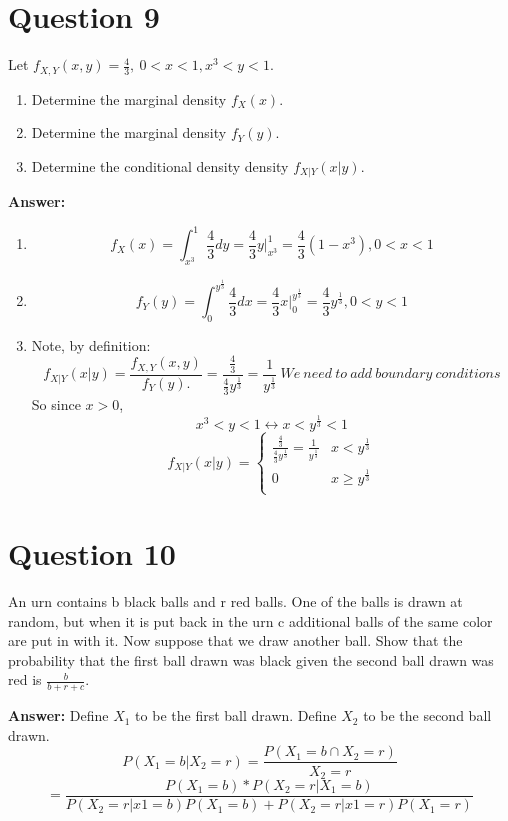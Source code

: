 \documentclass[svgnames]{article}
\begin{document}
\section{Question 9}
Let $f_{X,Y}(x,y)=\frac{4}{3},\ 0 < x <1, x^3 < y <1$.
\begin{enumerate}[label = (\alph*)]
\item
Determine the marginal density $f_X(x).$
\item 
Determine the marginal density $f_Y(y).$
\item
Determine the conditional density density $f_{X|Y}(x|y).$

\end{enumerate}
\textbf{Answer:}

\begin{enumerate}[label = (\alph*)]
\item
$$f_X(x)=\int^{1}_{x^3}\frac{4}{3}dy=\frac{4}{3}y\Big|^{1}_{x^3}=\frac{4}{3}(1-x^3), 0<x<1$$
\item
$$f_Y(y)=\int^{y^{\frac{1}{3}}}_{0}\frac{4}{3}dx=\frac{4}{3}x\Big|^{y^{\frac{1}{3}}}_{0}=\frac{4}{3}y^{\frac{1}{3}},0<y<1$$
\item
Note, by definition:
$$f_{X|Y}(x|y)=\frac{f_{X,Y}(x,y)}{f_Y(y).} = \frac{\frac{4}{3}}{\frac{4}{3}y^{\frac{1}{3}}}=\frac{1}{y^{\frac{1}{3}}} \ We \ need \ to \ add \ boundary \ conditions$$
So since $x > 0$, $$x^3<y<1 \leftrightarrow x < y^{\frac{1}{3}} < 1$$
\[f_{X|Y}(x|y)= \begin{cases} 
      \frac{\frac{4}{3}}{\frac{4}{3}y^{\frac{1}{3}}}=\frac{1}{y^{\frac{1}{3}}} & x < y^{\frac{1}{3}} \\
      0 &  x \geq y^{\frac{1}{3}} \\
   \end{cases}
\]
\end{enumerate}

\section{Question 10}
An urn contains b black balls and r red balls. One of the balls is drawn at random, but when
it is put back in the urn c additional balls of the same color are put in with it. Now suppose that
we draw another ball. Show that the probability that the first ball drawn was black given the
second ball drawn was red is $\frac{b}{b+r+c}$.

\textbf{Answer:}
\newline
\newline
Define $X_1$ to be the first ball drawn.
Define $X_2$ to be the second ball drawn.
$$P(X_1=b|X_2=r)=\frac{P(X_1=b \cap X_2=r)}{X_2=r}$$
$$=\frac{P(X_1=b)*P(X_2=r|X_1=b)}{P(X_2=r|x1=b)P(X_1=b)+P(X_2=r|x1=r)P(X_1=r)}$$
\end{document}
